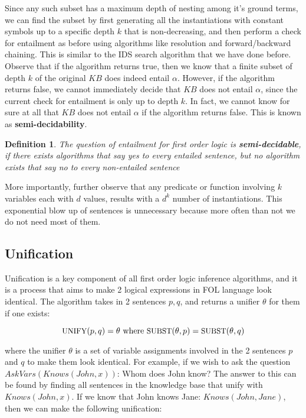 \documentclass[12pt]{article}
\newtheorem{definition}{Definition}
\begin{document}
Since any such subset has a maximum depth of nesting among it's ground terms, we can find the subset by first generating all the instantiations with constant symbols up to a specific depth $k$ that is non-decreasing, and then perform a check for entailment as before using algorithms like resolution and forward/backward chaining. This is similar to the IDS search algorithm that we have done before. \\

Observe that if the algorithm returns true, then we know that a finite subset of depth $k$ of the original $KB$ does indeed entail $\alpha$. However, if the algorithm returns false, we cannot immediately decide that $KB$ does not entail $\alpha$, since the current check for entailment is only up to depth $k$. In fact, we cannot know for sure at all that $KB$ does not entail $\alpha$ if the algorithm returns false. This is known as \textbf{semi-decidability}. 

\begin{definition}
The question of entailment for first order logic is \textbf{semi-decidable}, if there exists algorithms that say yes to every entailed sentence, but no algorithm exists that say no to every non-entailed sentence
\end{definition}

More importantly, further observe that any predicate or function involving $k$ variables each with $d$ values, results with a $d^k$ number of instantiations. This exponential blow up of sentences is unnecessary because more often than not we do not need most of them.

\subsection{Unification}

Unification is a key component of all first order logic inference algorithms, and it is a process that aims to make 2 logical expressions in FOL language look identical. The  algorithm takes in 2 sentences $p, q$, and returns a unifier $\theta$ for them if one exists:

\begin{equation*}
\text{\small{UNIFY}} (p, q) = \theta \text{ where } \text{\small{SUBST}} (\theta, p) = \text{\small{SUBST}}(\theta, q) 
\end{equation*}

where the unifier $\theta$ is a set of variable assignments involved in the 2 sentences $p$ and $q$ to make them look identical. For example, if we wish to ask the question $AskVars(Knows(John, x))$: Whom does John know? The answer to this can be found by finding all sentences in the knowledge base that unify with $Knows(John, x)$. If we know that John knows Jane: $Knows(John, Jane)$, then we can make the following unification:
\end{document}
